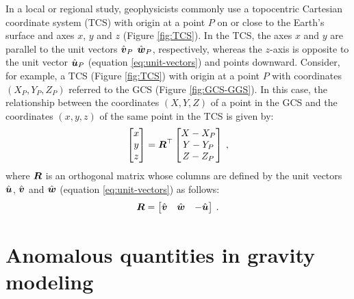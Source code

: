 \documentclass[extra]{gji}
\begin{document}
In a local or regional study, geophysicists commonly use a topocentric 
Cartesian coordinate system (TCS) with origin at a point $P$ on or 
close to the Earth's surface and axes $x$, $y$ and $z$ (Figure 
\ref{fig:TCS}). In the TCS, the axes $x$ and $y$ are parallel to 
the unit vectors $\hat{\mitbf{v}}_{P}$ $\hat{\mitbf{w}}_{P}$, respectively,
whereas the $z$-axis is opposite to the unit vector 
$\hat{\mitbf{u}}_{P}$ (equation \ref{eq:unit-vectors}) and points downward.
Consider, for example, a TCS (Figure \ref{fig:TCS}) with origin at a point $P$ with
coordinates $(X_{P}, Y_{P}, Z_{P})$ referred to the GCS (Figure \ref{fig:GCS-GGS}).
In this case, the relationship between the coordinates $(X, Y, Z)$ of a 
point in the GCS and the coordinates $(x, y, z)$ of the same point in the 
TCS is given by:
\begin{equation}
\begin{bmatrix}
x \\
y \\
z 
\end{bmatrix} =
\mitbf{R}^{\top} \begin{bmatrix}
X - X_{P} \\
Y - Y_{P} \\
Z - Z_{P}
\end{bmatrix} \: ,
\label{eq:GCS2TCS}
\end{equation}
where $\mitbf{R}$ is an orthogonal matrix whose columns
are defined by the unit vectors $\hat{\mitbf{u}}$, $\hat{\mitbf{v}}$ and
$\hat{\mitbf{w}}$ (equation \ref{eq:unit-vectors}) as follows:
\begin{equation}
\mitbf{R} = 
\begin{bmatrix}
\hat{\mitbf{v}} & \hat{\mitbf{w}} & -\hat{\mitbf{u}}
\end{bmatrix} \: .
\label{eq:R}
\end{equation}


\section{Anomalous quantities in gravity modeling}
\end{document}
